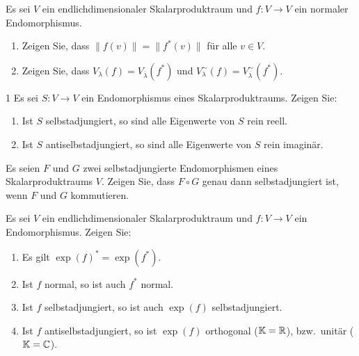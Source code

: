 \begin{question}[subtitle = Haupt- und Eigenräume normaler Endomorphismen]{1}
  Es sei $V$ ein endlichdimensionaler Skalarproduktraum und $f \colon V \to V$ ein normaler Endomorphismus.
  \begin{enumerate}[leftmargin=*]
    \item
      Zeigen Sie, dass $\|f(v)\| = \|f^*(v)\|$ für alle $v \in V$.
    \item
      Zeigen Sie, dass $V_\lambda(f) = V_{\overline{\lambda}}(f^*)$ und $V^\sim_\lambda(f) = V^\sim_{\overline{\lambda}}(f^*)$.
  \end{enumerate}
\end{question}


\begin{question}[subtitle = Eigenwerte (anti)selbstadjungierter Endomorphismen]{1}
  Es sei $S \colon V \to V$ ein Endomorphismus eines Skalarproduktraums.
  Zeigen Sie:
  \begin{enumerate}
    \item
      Ist $S$ selbstadjungiert, so sind alle Eigenwerte von $S$ rein reell.
    \item
      Ist $S$ antiselbstadjungiert, so sind alle Eigenwerte von $S$ rein imaginär.
  \end{enumerate}
\end{question}


\begin{question}[subtitle = Komposition selbstadjungierter Endomorphismen]{1}
  Es seien $F$ und $G$ zwei selbstadjungierte Endomorphismen eines Skalarproduktraums $V$.
  Zeigen Sie, dass $F \circ G$ genau dann selbstadjungiert ist, wenn $F$ und $G$ kommutieren.
\end{question}


\begin{question}[subtitle = Rechenregeln für das Matrixexponential]{1}
  Es sei $V$ ein endlichdimensionaler Skalarproduktraum und $f \colon V \to V$ ein Endomorphismus.
  Zeigen Sie:
  \begin{enumerate}[leftmargin=*]
    \item
      Es gilt $\exp(f)^* = \exp(f^*)$.
    \item
      Ist $f$ normal, so ist auch $f^*$ normal.
    \item
      Ist $f$ selbstadjungiert, so ist auch $\exp(f)$ selbstadjungiert.
    \item
      Ist $f$ antiselbstadjungiert, so ist $\exp(f)$ orthogonal ($\mathbb{K} = \mathbb{R}$), bzw.\ unitär ($\mathbb{K} = \mathbb{C}$).
  \end{enumerate}
\end{question}







